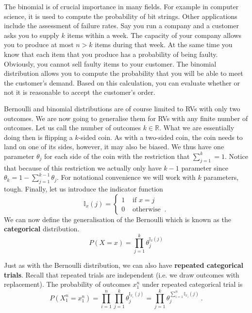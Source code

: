 The binomial is of crucial importance in many fields. For example in computer science, it is used to compute the probability of bit strings.
Other applications include the assessment of failure rates. Say you run a company and a customer asks you to supply $ k $ items within a week.
The capacity of your company allows you to produce at most $ n > k $ items during that week. At the same time you know that each item that you 
produce has a probability of being faulty. Obviously, you cannot sell faulty items to your customer. The binomial distribution allows you to
compute the probability that you will be able to meet the customer's demand. Based on this calculation, you can evaluate whether or not it is reasonable to
accept the customer's order.

Bernoulli and binomial distributions are of course limited to RVs with only two outcomes. We are now going to generalise them for 
RVs with any finite number of outcomes. Let us call the number of outcomes $ k \in \mathbb{R} $. What we are essentially doing then
is flipping a $ k $-sided coin. As with a two-sided coin, the coin needs to land on one of its sides, however, it may also be biased.
We thus have one parameter $ \theta_{j} $ for each side of the coin with the restriction that $ \sum_{j=1}^{k} = 1 $. Notice that
because of this restriction we actually only have $ k-1 $ parameter since $ \theta_{k} = 1 - \sum_{j=1}^{k-1}\theta_{j} $. For notational
convenience we will work with $ k $ parameters, tough. Finally, let us introduce the indicator function
\begin{equation}
\mathbb{I}_{x}(j) = \begin{cases}
1 & \mbox{ if } x = j \\
0 & \mbox{ otherwise } \ . 
\end{cases}
\end{equation}
We can now define the generalisation of the Bernoulli which is known as the \textbf{categorical} distribution.
\begin{equation}
P(X=x) = \prod_{j=1}^{k}\theta_{j}^{\mathbb{I}_{x}(j)}
\end{equation}

Just as with the Bernoulli distribution, we can also have \textbf{repeated categorical trials}. Recall that repeated trials
are independent (i.e. we draw outcomes with replacement). The probability of outcomes
$ x_{1}^{n} $ under repeated categorical trial is
\begin{equation}
P(X_{1}^{n} = x_{1}^{n}) = \prod_{i=1}^{n} \prod_{j=1}^{k}\theta_{j}^{\mathbb{I}_{x_{i}}(j)} = \prod_{j=1}^{k}\theta_{j}^{\sum_{i=1}^{n}\mathbb{I}_{x_{i}}(j)} \ .
\end{equation} 

